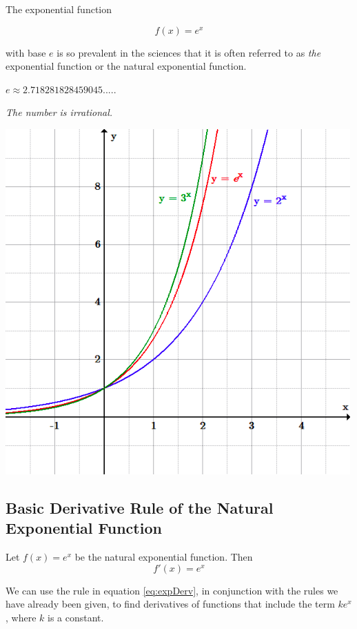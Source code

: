 \begin{tcolorbox}[title={Review: The Natural Exponential Function}]

\begin{multicols}{2}
The exponential function 

$$f(x) = e^x$$

with base $e$ is so prevalent in the sciences that it is often referred to as \textit{the} exponential function or the natural exponential function.

$e \approx 2.718281828459045.....$

\textit{The number is irrational.}

\columnbreak

\includegraphics[scale=0.3]{images/expoFun/exponentialGraphs.png}

\end{multicols}

\end{tcolorbox}
\subsection*{Basic Derivative Rule of the Natural Exponential Function}
\begin{tcolorbox}[title={Derivative of the Natural Exponential Function: Basic Rule}]
Let $f(x)=e^x$ be the natural exponential function. Then
\begin{equation}\label{eq:expDerv}
    f'(x)=e^x
\end{equation}
\end{tcolorbox}
\noindent We can use the rule in equation \ref{eq:expDerv}, in conjunction with the rules we have already been given, to find derivatives of functions that include the term $ke^x$, where $k$ is a constant. 

